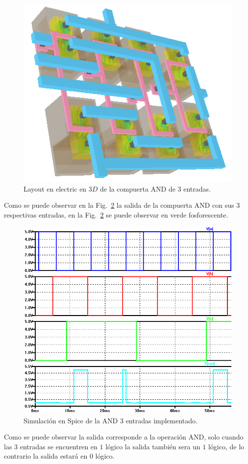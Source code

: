 \documentclass[twocolumn]{IEEEtran}
\begin{document}
\begin{figure}[H]
  \centering
    \includegraphics[scale=0.35]{./pics/3d_and_3.png}
      \caption{Layout en electric en $3D$ de la compuerta AND de $3$ entradas.}
	\label{fig2}
\end{figure}
\noindent
Como se puede observar en la Fig.~\ref{fig3} la salida de la compuerta AND con sus $3$ respectivas entradas, en la Fig.~\ref{fig3} se puede observar en verde fosforescente.
\begin{figure}[H]
  \centering
    \includegraphics[scale=0.3]{./pics/salida_and_3.png}
      \caption{Simulación en Spice de la AND $3$ entradas implementado.}
	\label{fig3}
\end{figure}
\noindent
Como se puede observar la salida corresponde a la operación AND, solo cuando las $3$ entradas se encuentren en $1$ lógico la salida también sera un $1$ lógico, de lo contrario la salida estará en $0$ lógico.
\end{document}

